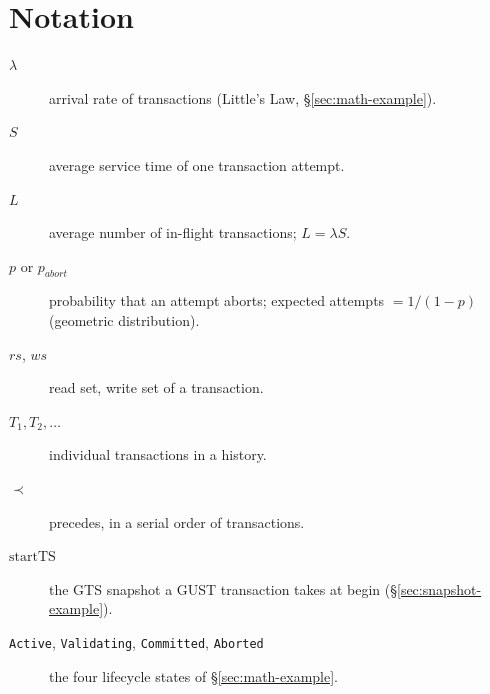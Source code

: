 \chapter{Notation}

\begin{description}
    \item[$\lambda$] arrival rate of transactions (Little's Law, \S\ref{sec:math-example}).
    \item[$S$] average service time of one transaction attempt.
    \item[$L$] average number of in-flight transactions; $L = \lambda S$.
    \item[$p$ or $p_{abort}$] probability that an attempt aborts; expected
          attempts $= 1/(1-p)$ (geometric distribution).
    \item[$\mathit{rs}$, $\mathit{ws}$] read set, write set of a transaction.
    \item[$T_1, T_2, \ldots$] individual transactions in a history.
    \item[$\prec$] precedes, in a serial order of transactions.
    \item[$\mathrm{startTS}$] the GTS snapshot a GUST transaction takes at
          begin (\S\ref{sec:snapshot-example}).
    \item[\texttt{Active}, \texttt{Validating}, \texttt{Committed},
          \texttt{Aborted}] the four lifecycle states of \S\ref{sec:math-example}.
\end{description}
